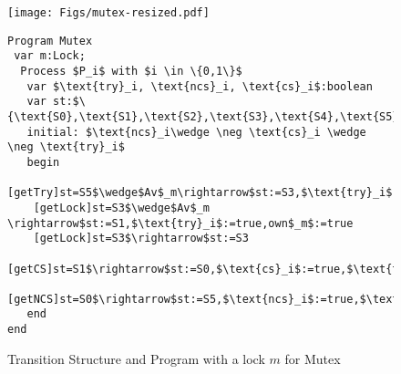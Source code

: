 \begin{figure}[t!]
\begin{minipage}[b]{0.40\linewidth}
\centering
\texttt{[image: Figs/mutex-resized.pdf]}
\end{minipage}
\begin{minipage}[b]{0.60\linewidth}
\centering
\begin{lstlisting}[style=Unity]
Program Mutex
 var m:Lock;
  Process $P_i$ with $i \in \{0,1\}$
   var $\text{try}_i, \text{ncs}_i, \text{cs}_i$:boolean
   var st:$\{\text{S0},\text{S1},\text{S2},\text{S3},\text{S4},\text{S5}\}$
   initial: $\text{ncs}_i\wedge \neg \text{cs}_i \wedge \neg \text{try}_i$ 
   begin
    [getTry]st=S5$\wedge$Av$_m\rightarrow$st:=S3,$\text{try}_i$:=true,$\text{ncs}_i$:=false
    [getLock]st=S3$\wedge$Av$_m \rightarrow$st:=S1,$\text{try}_i$:=true,own$_m$:=true
    [getLock]st=S3$\rightarrow$st:=S3
    [getCS]st=S1$\rightarrow$st:=S0,$\text{cs}_i$:=true,$\text{try}_i$:=false
    [getNCS]st=S0$\rightarrow$st:=S5,$\text{ncs}_i$:=true,$\text{cs}_i$:=false
   end
end
\end{lstlisting}
\end{minipage}
\caption{Transition Structure and Program with a lock $m$ for Mutex}\label{fig:mutex}
\end{figure}
%
